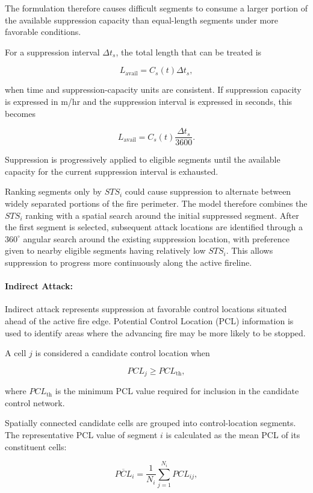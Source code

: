 The formulation therefore causes difficult segments to consume a larger portion
of the available suppression capacity than equal-length segments under more
favorable conditions.

For a suppression interval $\Delta t_s$, the total length that can be treated is

\[
L_{\mathrm{avail}}
=
C_s(t)\Delta t_s,
\]

when time and suppression-capacity units are consistent. If suppression capacity
is expressed in m/hr and the suppression interval is expressed in seconds, this
becomes

\[
L_{\mathrm{avail}}
=
C_s(t)
\frac{\Delta t_s}{3600}.
\]

Suppression is progressively applied to eligible segments until the available
capacity for the current suppression interval is exhausted.

Ranking segments only by $STS_i$ could cause suppression to alternate between
widely separated portions of the fire perimeter. The model therefore combines
the $STS_i$ ranking with a spatial search around the initial suppressed segment.
After the first segment is selected, subsequent attack locations are identified
through a $360^{\circ}$ angular search around the existing suppression location,
with preference given to nearby eligible segments having relatively low
$STS_i$. This allows suppression to progress more continuously along the active
fireline.


\paragraph{Indirect Attack:}

Indirect attack represents suppression at favorable control locations situated
ahead of the active fire edge. Potential Control Location (PCL) information is
used to identify areas where the advancing fire may be more likely to be stopped.

A cell $j$ is considered a candidate control location when

\[
PCL_j
\geq
PCL_{\mathrm{th}},
\]

where $PCL_{\mathrm{th}}$ is the minimum PCL value required for inclusion in the
candidate control network.

Spatially connected candidate cells are grouped into control-location segments.
The representative PCL value of segment $i$ is calculated as the mean PCL of
its constituent cells:

\[
\overline{PCL}_i
=
\frac{1}{N_i}
\sum_{j=1}^{N_i}
PCL_{ij},
\]

